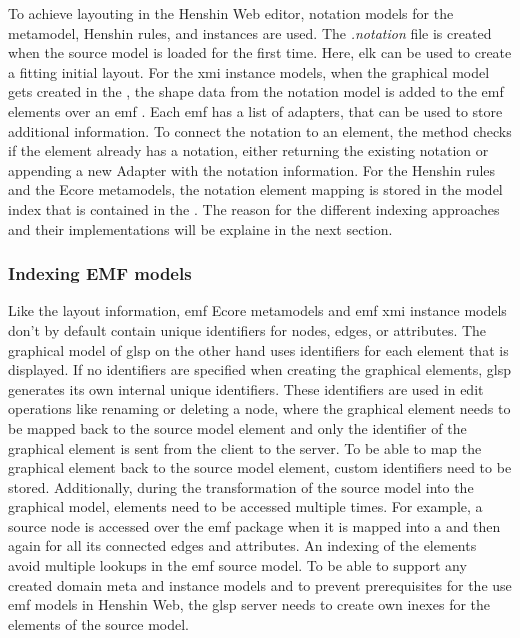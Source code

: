   To achieve layouting in the Henshin Web editor, notation models for the metamodel, Henshin rules, and instances are used. The \textit{.notation} file is created when the source model is loaded for the first time. Here, \ac{elk} can be used to create a fitting initial layout. For the \ac{xmi} instance models, when the graphical model gets created in the , the shape data from the notation model is added to the \ac{emf} elements over an \ac{emf} . Each \ac{emf}  has a list of adapters, that can be used to store additional information. \cite{emf} To connect the notation to an element, the  method checks if the element already has a notation, either returning the existing notation or appending a new Adapter with the notation information.
  For the Henshin rules and the Ecore metamodels, the notation element mapping is stored in the model index that is contained in the . The reason for the different indexing approaches and their implementations will be explaine in the next section. 

  
  \subsubsection{Indexing EMF models}
  \label{subsec:indexing}

  Like the layout information, \ac{emf} Ecore metamodels and \ac{emf} \ac{xmi} instance models don't by default contain unique identifiers for nodes, edges, or attributes. \cite{emf,emf-repo} The graphical model of \ac{glsp} on the other hand uses identifiers for each element that is displayed. If no identifiers are specified when creating the graphical elements, \ac{glsp} generates its own internal unique identifiers. These identifiers are used in edit operations like renaming or deleting a node, where the graphical element needs to be mapped back to the source model element and only the identifier of the graphical element is sent from the client to the server. To be able to map the graphical element back to the source model element, custom identifiers need to be stored. Additionally, during the transformation of the source model into the graphical model, elements need to be accessed multiple times. For example, a source node is accessed over the \ac{emf} package when it is mapped into a  and then again for all its connected edges and attributes. An indexing of the elements avoid multiple lookups in the \ac{emf} source model. To be able to support any created domain meta and instance models and to prevent prerequisites for the use \ac{emf} models in Henshin Web, the \ac{glsp} server needs to create own inexes for the elements of the source model. 

